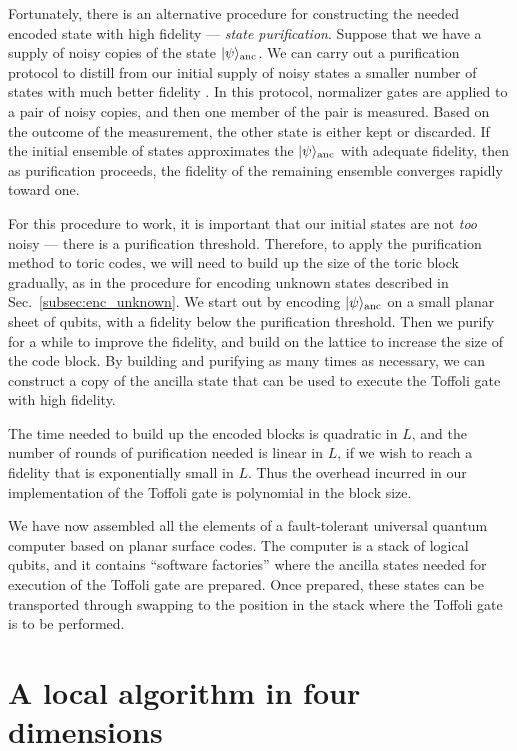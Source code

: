 Fortunately, there is an alternative procedure for constructing the needed encoded state with high fidelity --- {\em state purification}. Suppose that we have a supply of noisy copies of the state $|\psi\rangle_{\rm anc}$. We can carry out a purification protocol to distill from our initial supply of noisy states a smaller number of states with much better fidelity \cite{kit_purify,dennis}. In this protocol, normalizer gates are applied to a pair of noisy copies, and then one member of the pair is measured. Based on the outcome of the measurement, the other state is either kept or discarded. If the initial ensemble of states approximates the $|\psi\rangle_{\rm anc}$ with adequate fidelity, then as purification proceeds, the fidelity of the remaining ensemble converges rapidly toward one.

For this procedure to work, it is important that our initial states are not {\em too} noisy --- there is a purification threshold. Therefore, to apply the purification method to toric codes, we will need to build up the size of the toric block gradually, as in the procedure for encoding unknown states described in Sec.~\ref{subsec:enc_unknown}. We start out by encoding $|\psi\rangle_{\rm anc}$ on a small planar sheet of qubits, with a fidelity below the purification threshold. Then we purify for a while to improve the fidelity, and build on the lattice to increase the size of the code block. By building and purifying as many times as necessary, we can construct a copy of the ancilla state that can be used to execute the Toffoli gate with high fidelity.

The time needed to build up the encoded blocks is quadratic in $L$, and the number of rounds of purification needed is linear in $L$, if we wish to reach a fidelity that is exponentially small in $L$. Thus the overhead incurred in our implementation of the Toffoli gate is polynomial in the block size.

We have now assembled all the elements of a fault-tolerant universal quantum computer based on planar surface codes. The computer is a stack of logical qubits, and it contains  ``software factories'' where the ancilla states needed for execution of the Toffoli gate are prepared. Once prepared, these states can be transported through swapping to the position in the stack where the Toffoli gate is to be performed.
 

\section{A local algorithm in four dimensions}
\label{sec:four_dim}

